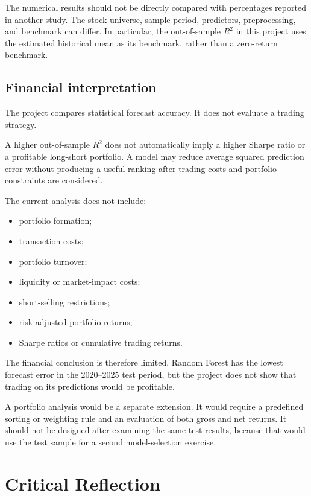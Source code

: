 \documentclass[11pt,a4paper]{article}
\begin{document}
The numerical results should not be directly compared with percentages reported
in another study. The stock universe, sample period, predictors, preprocessing,
and benchmark can differ. In particular, the out-of-sample \(R^2\) in this
project uses the estimated historical mean as its benchmark, rather than a
zero-return benchmark.

\subsection{Financial interpretation}

The project compares statistical forecast accuracy. It does not evaluate a
trading strategy.

A higher out-of-sample \(R^2\) does not automatically imply a higher Sharpe
ratio or a profitable long-short portfolio. A model may reduce average squared
prediction error without producing a useful ranking after trading costs and
portfolio constraints are considered.

The current analysis does not include:

\begin{itemize}
  \item portfolio formation;
  \item transaction costs;
  \item portfolio turnover;
  \item liquidity or market-impact costs;
  \item short-selling restrictions;
  \item risk-adjusted portfolio returns;
  \item Sharpe ratios or cumulative trading returns.
\end{itemize}

The financial conclusion is therefore limited. Random Forest has the lowest
forecast error in the 2020--2025 test period, but the project does not show that
trading on its predictions would be profitable.

A portfolio analysis would be a separate extension. It would require a
predefined sorting or weighting rule and an evaluation of both gross and net
returns. It should not be designed after examining the same test results,
because that would use the test sample for a second model-selection exercise.

\section{Critical Reflection}
\label{sec:critical-reflection}
\end{document}
